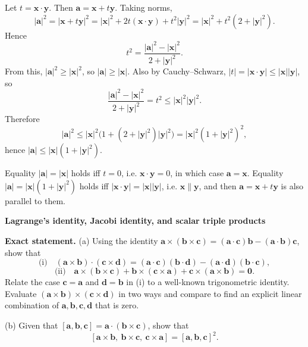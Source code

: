 \begin{solution}
Let \(t=\mathbf x\cdot \mathbf y\). Then \(\mathbf a=\mathbf x+t\mathbf y\). Taking norms,
\[
|\mathbf a|^2=|\mathbf x+t\mathbf y|^2
=|\mathbf x|^2+2t(\mathbf x\cdot \mathbf y)+t^2|\mathbf y|^2
=|\mathbf x|^2+t^2(2+|\mathbf y|^2).
\]
Hence
\[
t^2=\frac{|\mathbf a|^2-|\mathbf x|^2}{2+|\mathbf y|^2}.
\]
From this, \(|\mathbf a|^2\ge |\mathbf x|^2\), so \(|\mathbf a|\ge |\mathbf x|\).
Also by Cauchy--Schwarz, \(|t|=|\mathbf x\cdot \mathbf y|\le |\mathbf x||\mathbf y|\), so
\[
\frac{|\mathbf a|^2-|\mathbf x|^2}{2+|\mathbf y|^2}=t^2\le |\mathbf x|^2|\mathbf y|^2.
\]
Therefore
\[
|\mathbf a|^2\le |\mathbf x|^2\bigl(1+(2+|\mathbf y|^2)|\mathbf y|^2\bigr)
=|\mathbf x|^2(1+|\mathbf y|^2)^2,
\]
hence \(|\mathbf a|\le |\mathbf x|(1+|\mathbf y|^2)\).

Equality \(|\mathbf a|=|\mathbf x|\) holds iff \(t=0\), i.e. \(\mathbf x\cdot \mathbf y=0\), in which case \(\mathbf a=\mathbf x\).
Equality \(|\mathbf a|=|\mathbf x|(1+|\mathbf y|^2)\) holds iff \(|\mathbf x\cdot\mathbf y|=|\mathbf x||\mathbf y|\), i.e. \(\mathbf x\parallel \mathbf y\),
and then \(\mathbf a=\mathbf x+t\mathbf y\) is also parallel to them.
\end{solution}

\begin{problem}[CP-I-0094]
\label{prob:cp-i-0094}
\textbf{Lagrange’s identity, Jacobi identity, and scalar triple products}

\textbf{Exact statement.}
\hspace*{1.5em}(a) Using the identity \(\mathbf a\times(\mathbf b\times\mathbf c)=(\mathbf a\cdot\mathbf c)\mathbf b-(\mathbf a\cdot\mathbf b)\mathbf c\), show that
\[
\text{(i)}\quad
(\mathbf a\times\mathbf b)\cdot(\mathbf c\times\mathbf d)
=(\mathbf a\cdot\mathbf c)(\mathbf b\cdot\mathbf d)-(\mathbf a\cdot\mathbf d)(\mathbf b\cdot\mathbf c),
\]
\[
\text{(ii)}\quad
\mathbf a\times(\mathbf b\times\mathbf c)+\mathbf b\times(\mathbf c\times\mathbf a)+\mathbf c\times(\mathbf a\times\mathbf b)=\mathbf 0.
\]
Relate the case \(\mathbf c=\mathbf a\) and \(\mathbf d=\mathbf b\) in (i) to a well-known trigonometric identity.
Evaluate \((\mathbf a\times\mathbf b)\times(\mathbf c\times\mathbf d)\) in two ways and compare to find an explicit linear combination of
\(\mathbf a,\mathbf b,\mathbf c,\mathbf d\) that is zero.

(b) Given that \([\mathbf a,\mathbf b,\mathbf c]=\mathbf a\cdot(\mathbf b\times\mathbf c)\), show that
\[
[\mathbf a\times\mathbf b,\ \mathbf b\times\mathbf c,\ \mathbf c\times\mathbf a]=[\mathbf a,\mathbf b,\mathbf c]^2.
\]

\end{problem}

